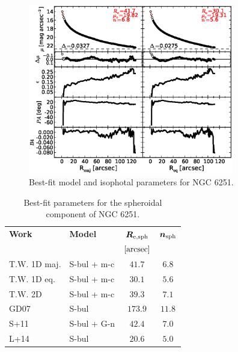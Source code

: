 \documentclass[preprint2]{emulateapj}
\newcommand{\fitfigurewidth}{0.8\textwidth}
\begin{document}
  \begin{figure}[h]
  \begin{center}
  \includegraphics[width=\fitfigurewidth]{images/n6251_1Dfit.eps}
  \caption{Best-fit model and isophotal parameters for NGC 6251.}
  \end{center}
  \end{figure}

  \begin{table}[h]
  \small
  \caption{Best-fit parameters for the spheroidal component of NGC 6251.}
  \begin{center}
  \begin{tabular}{llcc}
  \hline
  {\bf Work} & {\bf Model}   & $\bm R_{\rm e,sph}$    & $\bm n_{\rm sph}$ \\
    &  &  $[\rm arcsec]$ & \\
  \hline
  T.W. 1D maj. & S-bul + m-c & $41.7$  &  $6.8$ \\
  T.W. 1D eq.  & S-bul + m-c & $30.1$  &  $5.6$ \\
  T.W. 2D      & S-bul + m-c & $39.3$  &  $7.1$ \\
  \hline
  GD07      & S-bul	     & $173.9$  &  $11.8$ \\
  S+11      & S-bul + G-n    & $42.4$	&  $7.0$ \\
  L+14      & S-bul	     & $20.6$	&  $5.0$ \\
  \hline
  \end{tabular}
  \end{center}
  \label{tab:n6251}
  \end{table}
\end{document}

